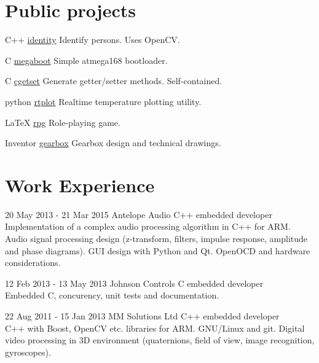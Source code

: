 \documentclass{tccv}
\begin{document}
\section{Public projects}
\begin{yearlist}
\item{C++}
     {\href{https://github.com/MiroslavVitkov/identity}{identity}}
     {Identify persons. Uses OpenCV.}

\item{C}
     {\href{https://github.com/MiroslavVitkov/megaboot}{megaboot}}
     {Simple atmega168 bootloader.}

\item{C}
     {\href{https://github.com/MiroslavVitkov/cgetset}{cgetset}}
     {Generate getter/setter methods. Self-contained.}

\item{python}
     {\href{https://github.com/MiroslavVitkov/rtplot}{rtplot}}
     {Realtime temperature plotting utility.}

\item{LaTeX}
     {\href{https://github.com/MiroslavVitkov/rpg}{rpg}}
     {Role-playing game.}

\item{Inventor}
     {\href{https://github.com/MiroslavVitkov/gearbox}{gearbox}}
     {Gearbox design and technical drawings.}
\end{yearlist}


\pagebreak
\section{Work Experience}
\begin{eventlist}
\item{20 May 2013 - 21 Mar 2015}
     {Antelope Audio}
     {C++ embedded developer} \\
Implementation of a complex audio processing algorithm in C++ for ARM.
Audio signal processing design (z-transform, filters, impulse response, amplitude and phase diagrams).
GUI design with Python and Qt.
OpenOCD and hardware considerations.

\item{12 Feb 2013 - 13 May 2013}
     {Johnson Controls}
     {C embedded developer} \\
Embedded C, concurency, unit tests and documentation.

\item{22 Aug 2011 - 15 Jan 2013}
     {MM Solutions Ltd}
     {C++ embedded developer} \\
C++ with Boost, OpenCV etc. libraries for ARM.
GNU/Linux and git.
Digital video processing in 3D environment (quaternions, field of view, image recognition, gyroscopes).
\end{eventlist}
\end{document}
